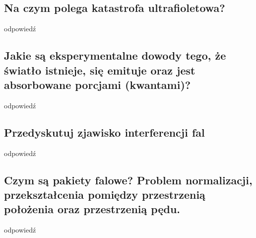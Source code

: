\subsection{Na czym polega katastrofa ultrafioletowa?}

odpowiedź

\subsection{Jakie są eksperymentalne dowody tego, że światło istnieje, się emituje oraz jest absorbowane porcjami (kwantami)?}

odpowiedź

\subsection{Przedyskutuj zjawisko interferencji fal}

odpowiedź

\subsection{Czym są pakiety falowe? Problem normalizacji, przekształcenia pomiędzy przestrzenią położenia oraz przestrzenią pędu.}

odpowiedź

